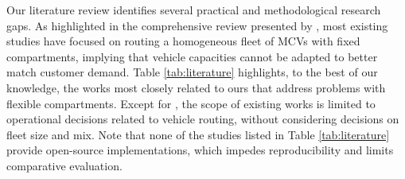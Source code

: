 \documentclass[11pt]{elsarticle}
\theoremstyle{plain}
\newcommand{\blue}[1]{#1}
\begin{document}
Our literature review identifies several practical and methodological research gaps. \blue{As highlighted in the comprehensive review presented by \cite{OstermeierHübner2018}, m}ost existing studies have focused on routing \blue{a homogeneous fleet of} \acp{MCV} with fixed compartments, implying that vehicle capacities cannot be adapted to better match customer demand. \blue{Table \ref{tab:literature} highlights, to the best of our knowledge, the works most closely related to ours that address problems with flexible compartments. Except for \cite{OstermeierHübner2018}, the scope of existing works} is limited to operational decisions related to \blue{vehicle} routing, without considering decisions on fleet size and mix. \blue{Note that none of the studies listed in Table \ref{tab:literature} provide open-source implementations, which impedes reproducibility and limits comparative evaluation.}

\begin{table}[htbp]
  \centering
  \caption{\blue{Synthesis of related works with flexible compartments.}}
  \label{tab:literature}%
\end{table}%
\end{document}
